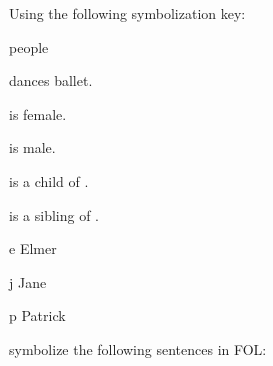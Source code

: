 \solutions
\problempart
\label{pr.FOLballet}
Using the following symbolization key:
\begin{ekey}
\item[\text{domain}] people
\item[\atom{D}{x}]  dances ballet.
\item[\atom{F}{x}]  is female.
\item[\atom{M}{x}]  is male.
\item[\atom{C}{x,y}]  is a child of .
\item[\atom{S}{x,y}]  is a sibling of .
\item[e] Elmer
\item[j] Jane
\item[p] Patrick
\end{ekey}
symbolize the following sentences in FOL:
